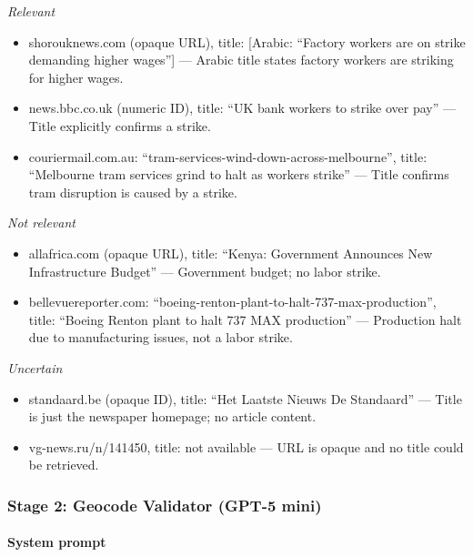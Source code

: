 \documentclass[
  11pt,
]{article}
\providecommand{\tightlist}{%
  \setlength{\itemsep}{0pt}\setlength{\parskip}{0pt}}
\begin{document}
\emph{Relevant}

\begin{itemize}
\tightlist
\item
  shorouknews.com (opaque URL), title: {[}Arabic: ``Factory workers are
  on strike demanding higher wages''{]} --- Arabic title states factory
  workers are striking for higher wages.
\item
  news.bbc.co.uk (numeric ID), title: ``UK bank workers to strike over
  pay'' --- Title explicitly confirms a strike.
\item
  couriermail.com.au: ``tram-services-wind-down-across-melbourne'',
  title: ``Melbourne tram services grind to halt as workers strike'' ---
  Title confirms tram disruption is caused by a strike.
\end{itemize}

\emph{Not relevant}

\begin{itemize}
\tightlist
\item
  allafrica.com (opaque URL), title: ``Kenya: Government Announces New
  Infrastructure Budget'' --- Government budget; no labor strike.
\item
  bellevuereporter.com:
  ``boeing-renton-plant-to-halt-737-max-production'', title: ``Boeing
  Renton plant to halt 737 MAX production'' --- Production halt due to
  manufacturing issues, not a labor strike.
\end{itemize}

\emph{Uncertain}

\begin{itemize}
\tightlist
\item
  standaard.be (opaque ID), title: ``Het Laatste Nieuws \textbar{} De
  Standaard'' --- Title is just the newspaper homepage; no article
  content.
\item
  vg-news.ru/n/141450, title: not available --- URL is opaque and no
  title could be retrieved.
\end{itemize}

\subsubsection{Stage 2: Geocode Validator (GPT-5
mini)}\label{stage-2-geocode-validator-gpt-5-mini}

\paragraph{System prompt}\label{system-prompt}
\end{document}
